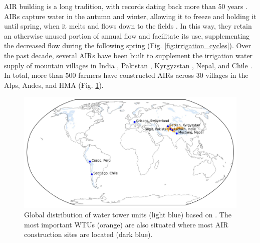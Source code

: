 \ac{AIR} building is a long tradition, with records dating back more than 50 years
\citep{nusserSociohydrologyArtificialGlaciers2019}. \ac{AIRs} capture water in the autumn and winter, allowing
it to freeze and holding it until spring, when it melts and flows down to the fields
\citep{ipccChapterHighMountain2019, vinceGlacierMan2009, clouseLadakhArtificialGlaciers2017,
nusserSociohydrologyArtificialGlaciers2019}. In this way, they retain an otherwise unused portion of annual flow
and facilitate its use, supplementing the decreased flow during the following spring (Fig.
\ref{fig:irrigation_cycles}). Over the past decade, several \ac{AIRs} have been built to supplement the
irrigation water supply of mountain villages in India \citep{wangchukIceStupaCompetition2020,
palmerStoringFrozenWater2022, aggarwalAdaptationClimateChange2021}, Pakistan
\citep{awazproductionIceStupaArtificial2022}, Kyrgyzstan \citep{bbcnewsBrightArtificialGlacier2020}, Nepal, and
Chile \citep{reutersConservationistsChileAim2021}. In total, more than 500 farmers have constructed \ac{AIRs}
across 30 villages in the Alps, Andes, and \ac{HMA} (Fig. \ref{fig:WTUs_AIRs}).

\begin{figure}[htb]
	\centering
	\includegraphics[width=\textwidth]{figs/WTUs_AIRs.jpg}

	\caption{ Global distribution of water tower units (light blue) based on
		\citet{immerzeelImportanceVulnerabilityWorld2020}. The most important \ac{WTUs} (orange) are also situated where most 
		AIR construction sites  are located (dark blue). }

	\label{fig:WTUs_AIRs}
\end{figure}

